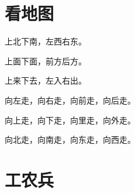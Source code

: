 \documentclass[12pt,UTF-8,openany]{ctexbook}
\begin{document}
\hanzibox{}\hanzibox{}\hanzibox{}\hanzibox{}\hspace{1em}\hanzibox{}\hanzibox{}\hanzibox{}\hanzibox{}

\hanzibox{}\hanzibox{}\hanzibox{}\hanzibox{}\hspace{1em}\hanzibox{}\hanzibox{}\hanzibox{}\hanzibox{}






\chapter{看地图}

\begin{large}
    
    上北下南，左西右东。
    
    上面下面，前方后方。
    
    上来下去，左入右出。
    
    向左走，向右走，向前走，向后走。
    
    向上走，向下走，向里走，向外走。
    
    向北走，向南走，向东走，向西走。
    
\end{large}


\clearpage

\begin{center}
    
\end{center}


\hanzibox{}\hanzibox{}\hanzibox{}\hanzibox{}\hspace{1em}\hanzibox{}\hanzibox{}\hanzibox{}\hanzibox{}

\hanzibox{}\hanzibox{}\hanzibox{}\hanzibox{}\hspace{1em}\hanzibox{}\hanzibox{}\hanzibox{}\hanzibox{}

\hanzibox{}\hanzibox{}\hanzibox{}\hanzibox{}\hspace{1em}\hanzibox{}\hanzibox{}\hanzibox{}\hanzibox{}






\chapter{工农兵}
\end{document}
